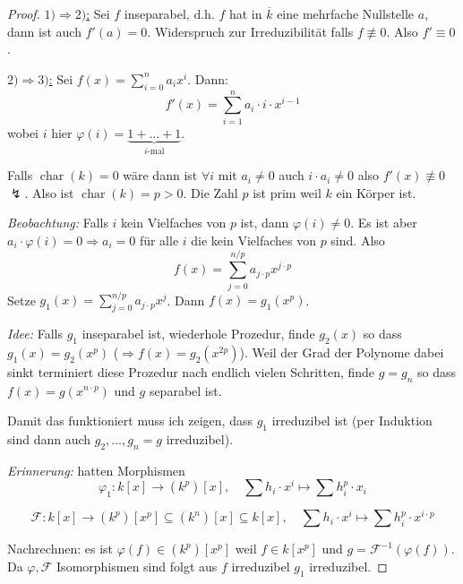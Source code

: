 \documentclass[12pt,parskip=full]{scrartcl}
\newcommand{\heading}{\underline}
\theoremstyle{definition}
\theoremstyle{remark}
\begin{document}
	\begin{proof}
		\heading{$1) \Rightarrow 2)$:} Sei $f$ inseparabel, d.h. $f$ hat in $\overline{k}$ eine mehrfache Nullstelle $a$, dann ist auch $f'(a) = 0$. Widerspruch zur Irreduzibilität falls $f \not\equiv 0$. Also $f' \equiv 0$.
		
		\heading{$2) \Rightarrow 3)$:} Sei $f(x) = \sum_{i=0}^n a_i x^i$. Dann:
		\begin{equation*}
			f'(x) = \sum_{i = 1}^n a_i \cdot i \cdot x^{i-1}
		\end{equation*}
		wobei $i$ hier $\varphi(i) = \underbrace{1 + \dots + 1}_\text{$i$-mal}$.
		
		Falls $\operatorname{char}(k) = 0$ wäre dann ist $\forall i$ mit $a_i \neq 0$ auch $i \cdot a_i \neq 0$ also $f'(x) \not\equiv 0$ $\lightning$. Also ist $\operatorname{char}(k) = p > 0$. Die Zahl $p$ ist prim weil $k$ ein Körper ist.
		
		\textit{Beobachtung:} Falls $i$ kein Vielfaches von $p$ ist, dann $\varphi(i) \neq 0$. Es ist aber $a_i \cdot \varphi(i) = 0 \Rightarrow a_i = 0$ für alle $i$ die kein Vielfaches von $p$ sind. Also
		\begin{equation*}
			f(x) = \sum_{j = 0}^{n/p} a_{j \cdot p} x^{j \cdot p}
		\end{equation*}
		Setze $g_1(x) = \sum_{j = 0}^{n/p} a_{j \cdot p} x^j$. Dann $f(x) = g_1(x^p)$.
		
		\textit{Idee:} Falls $g_1$ inseparabel ist, wiederhole Prozedur, finde $g_2(x)$ so dass $g_1(x) = g_2(x^p)$ ($\Rightarrow f(x) = g_2(x^{2p})$). Weil der Grad der Polynome dabei sinkt terminiert diese Prozedur nach endlich vielen Schritten, finde $g = g_n$ so dass $f(x) = g(x^{n \cdot p})$ und $g$ separabel ist.
		
		Damit das funktioniert muss ich zeigen, dass $g_1$ irreduzibel ist (per Induktion sind dann auch $g_2, \dots, g_n = g$ irreduzibel).
		
		\textit{Erinnerung:} hatten Morphismen
		\begin{equation*}
			\varphi_1: k[x] \to (k^p)[x], \quad \sum h_i \cdot x^i \mapsto \sum h_i^p \cdot x_i
		\end{equation*}
		
		\begin{equation*}
			\mathcal{F}: k[x] \to (k^p)[x^p] \subseteq (k^n)[x] \subseteq k[x], \quad \sum h_i \cdot x^i \mapsto \sum h_i^p \cdot x^{i \cdot p}
		\end{equation*}
		
		Nachrechnen: es ist $\varphi(f) \in (k^p)[x^p]$ weil $f \in k[x^p]$ und $g = \mathcal{F}^{-1}(\varphi(f))$. Da $\varphi, \mathcal{F}$ Isomorphismen sind folgt aus $f$ irreduzibel $g_1$ irreduzibel.
		

\end{proof}
\end{document}

